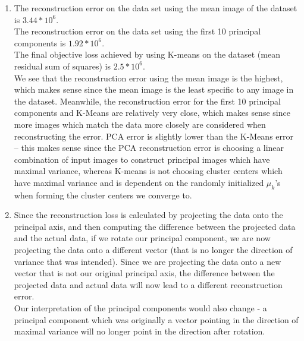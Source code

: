 \documentclass[submit]{harvardml}
\begin{document}
\begin{enumerate}
  \item
  The reconstruction error on the data set using the mean image of the dataset is $3.44 * 10^6$. \\
  The reconstruction error on the data set using the first 10 principal components is $1.92*10^6$. \\
  The final objective loss achieved by using K-means on the dataset (mean residual sum of squares) is $2.5*10^6$. \\
  We see that the reconstruction error using the mean image is the highest, which makes sense since the mean image is the least specific to any image in the dataset. Meanwhile, the reconstruction error for the first 10 principal components and K-Means are relatively very close, which makes sense since more images which match the data more closely are considered when reconstructing the error. PCA error is slightly lower than the K-Means error -- this makes sense since the PCA reconstruction error is choosing a linear combination of input images to construct principal images which have maximal variance, whereas K-means is not choosing cluster centers which have maximal variance and is dependent on the randomly initialized $\mu_k$'s when forming the cluster centers we converge to. 
  
  \item 
  Since the reconstruction loss is calculated by projecting the data onto the principal axis, and then computing the difference between the projected data and the actual data, if we rotate our principal component, we are now projecting the data onto a different vector (that is no longer the direction of variance that was intended). Since we are projecting the data onto a new vector that is not our original principal axis, the difference between the projected data and actual data will now lead to a different reconstruction error. \\
  Our interpretation of the principal components would also change - a principal component which was originally a vector pointing in the direction of maximal variance will no longer point in the direction after rotation. 
\end{enumerate}

\newpage
\end{document}
